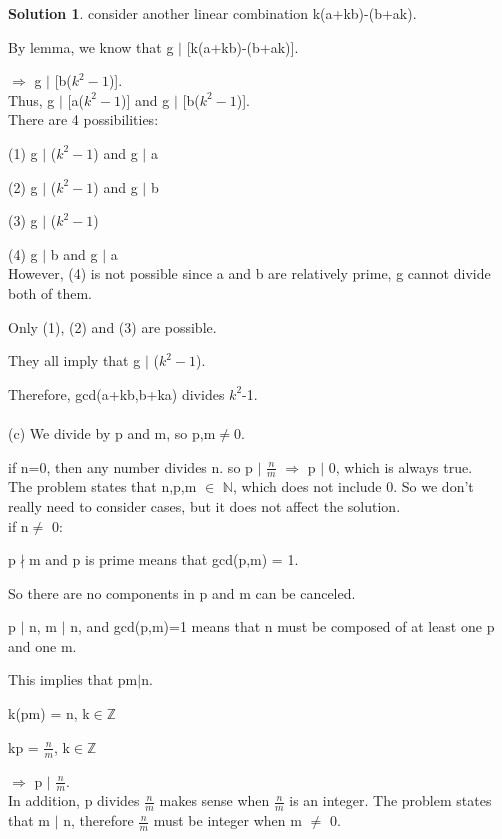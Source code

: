 \documentclass{article}
\theoremstyle{definition}
\newtheorem*{solution}{Solution}
\begin{document}
\begin{solution}
consider another linear combination k(a+kb)-(b+ak).

By lemma, we know that g \(|\) [k(a+kb)-(b+ak)].

\(\Rightarrow\) g \(|\) [b(\(k^2-1\))].\\

Thus, g \(|\) [a(\(k^2-1\))] and g \(|\) [b(\(k^2-1\))].\\

There are 4 possibilities:

(1) g \(|\) (\(k^2-1\)) and g \(|\) a

(2) g \(|\) (\(k^2-1\)) and g \(|\) b 

(3) g \(|\) (\(k^2-1\))

(4) g \(|\) b and g \(|\) a\\

However, (4) is not possible since a and b are relatively prime, g cannot divide both of them.

Only (1), (2) and (3) are possible.

They all imply that g \(|\) (\(k^2-1\)).

Therefore, gcd(a+kb,b+ka) divides \(k^2\)-1.\\\\


















(c)
We divide by p and m, so p,m\(\neq\)0.

if n=0, then any number divides n. so p \(|\) \(\frac{n}{m}\) \(\Rightarrow\)  p \(|\) 0, which is always true.\\

The problem states that n,p,m \(\in\) \(\mathbb{N}\), which does not include 0. So we don't really need to consider cases, but it does not affect the solution.\\

if n\(\neq\) 0:

p\(\nmid\)m and p is prime means that gcd(p,m) = 1.

So there are no components in p and m can be canceled.

p \(|\) n, m \(|\) n, and gcd(p,m)=1 means that n must be composed of at least one p and one m.

This implies that pm\(|\)n.

k(pm) = n, k\(\in\)\(\mathbb{Z}\)

kp = \(\frac{n}{m}\), k\(\in\)\(\mathbb{Z}\)

\(\Rightarrow\) p \(|\) \(\frac{n}{m}\).\\


In addition, p divides \(\frac{n}{m}\) makes sense when \(\frac{n}{m}\) is an integer. The problem states that m \(|\) n, therefore \(\frac{n}{m}\) must be integer when m \(\neq\) 0.  \\\\



\end{solution}
\end{document}
